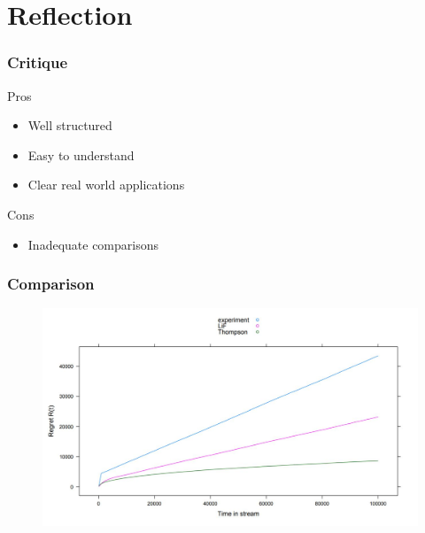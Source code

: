 \documentclass{beamer}
\begin{document}
\section{Reflection}

\begin{frame}
  \frametitle{Critique}
    \begin{block}{Pros}
      \begin{itemize}
        \item Well structured
        \item Easy to understand
        \item Clear real world applications
      \end{itemize}
    \end{block}
  \begin{block}{Cons}
    \begin{itemize}
      \item Inadequate comparisons
    \end{itemize}
  \end{block}
\end{frame}

\begin{frame}
    \frametitle{Comparison}
     
    \begin{figure}
            \centering
            \includegraphics[width=\textwidth]{images/sim_5}
            \label{fig:alg}
        \end{figure}
\end{frame}
\end{document}
